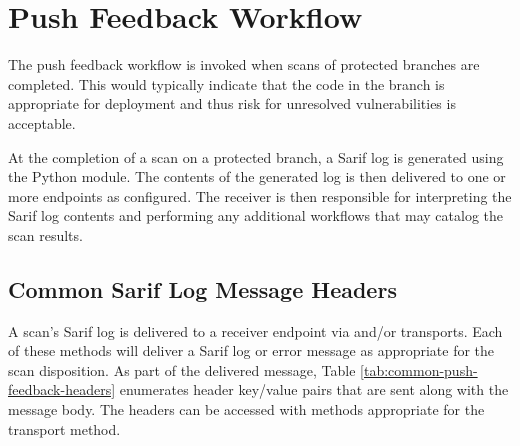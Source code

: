 \section{Push Feedback Workflow}\label{sec:push-workflow}

The push feedback workflow is invoked when scans of protected branches are completed.
This would typically indicate that the code in the branch is appropriate for deployment and
thus risk for unresolved vulnerabilities is acceptable.

At the completion of a scan on a protected branch, a Sarif log is generated using the
\cxonesarif Python module.  The contents of the generated log is then delivered to one
or more endpoints as configured.  The receiver is then responsible for interpreting the
Sarif log contents and performing any additional workflows that may catalog the
scan results.


\subsection{Common Sarif Log Message Headers}
A scan's Sarif log is delivered to a receiver endpoint via 
and/or  transports.  Each of these methods will deliver a Sarif log
or error message as appropriate for the scan disposition.  As part of the delivered message,
Table \ref{tab:common-push-feedback-headers} enumerates header key/value pairs that are sent along with
the message body.  The headers can be accessed with methods appropriate for the transport method.


